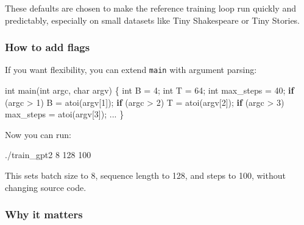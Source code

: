 \documentclass[
  letterpaper,
  DIV=11,
  numbers=noendperiod]{scrreprt}
\newenvironment{Shaded}{\begin{snugshade}}{\end{snugshade}}
\newcommand{\ControlFlowTok}[1]{\textcolor[rgb]{0.00,0.23,0.31}{\textbf{#1}}}
\newcommand{\DataTypeTok}[1]{\textcolor[rgb]{0.68,0.00,0.00}{#1}}
\newcommand{\DecValTok}[1]{\textcolor[rgb]{0.68,0.00,0.00}{#1}}
\newcommand{\ExtensionTok}[1]{\textcolor[rgb]{0.00,0.23,0.31}{#1}}
\newcommand{\NormalTok}[1]{\textcolor[rgb]{0.00,0.23,0.31}{#1}}
\newcommand{\OperatorTok}[1]{\textcolor[rgb]{0.37,0.37,0.37}{#1}}
\begin{document}
These defaults are chosen to make the reference training loop run
quickly and predictably, especially on small datasets like Tiny
Shakespeare or Tiny Stories.

\subsubsection{How to add flags}\label{how-to-add-flags}

If you want flexibility, you can extend \texttt{main} with argument
parsing:

\begin{Shaded}
\begin{Highlighting}[]
\DataTypeTok{int}\NormalTok{ main}\OperatorTok{(}\DataTypeTok{int}\NormalTok{ argc}\OperatorTok{,} \DataTypeTok{char}\NormalTok{ argv}\OperatorTok{)} \OperatorTok{\{}
    \DataTypeTok{int}\NormalTok{ B }\OperatorTok{=} \DecValTok{4}\OperatorTok{;}
    \DataTypeTok{int}\NormalTok{ T }\OperatorTok{=} \DecValTok{64}\OperatorTok{;}
    \DataTypeTok{int}\NormalTok{ max\_steps }\OperatorTok{=} \DecValTok{40}\OperatorTok{;}
    \ControlFlowTok{if} \OperatorTok{(}\NormalTok{argc }\OperatorTok{\textgreater{}} \DecValTok{1}\OperatorTok{)}\NormalTok{ B }\OperatorTok{=}\NormalTok{ atoi}\OperatorTok{(}\NormalTok{argv}\OperatorTok{[}\DecValTok{1}\OperatorTok{]);}
    \ControlFlowTok{if} \OperatorTok{(}\NormalTok{argc }\OperatorTok{\textgreater{}} \DecValTok{2}\OperatorTok{)}\NormalTok{ T }\OperatorTok{=}\NormalTok{ atoi}\OperatorTok{(}\NormalTok{argv}\OperatorTok{[}\DecValTok{2}\OperatorTok{]);}
    \ControlFlowTok{if} \OperatorTok{(}\NormalTok{argc }\OperatorTok{\textgreater{}} \DecValTok{3}\OperatorTok{)}\NormalTok{ max\_steps }\OperatorTok{=}\NormalTok{ atoi}\OperatorTok{(}\NormalTok{argv}\OperatorTok{[}\DecValTok{3}\OperatorTok{]);}
    \OperatorTok{...}
\OperatorTok{\}}
\end{Highlighting}
\end{Shaded}

Now you can run:

\begin{Shaded}
\begin{Highlighting}[]
\ExtensionTok{./train\_gpt2}\NormalTok{ 8 128 100}
\end{Highlighting}
\end{Shaded}

This sets batch size to 8, sequence length to 128, and steps to 100,
without changing source code.

\subsubsection{Why it matters}\label{why-it-matters-29}
\end{document}

